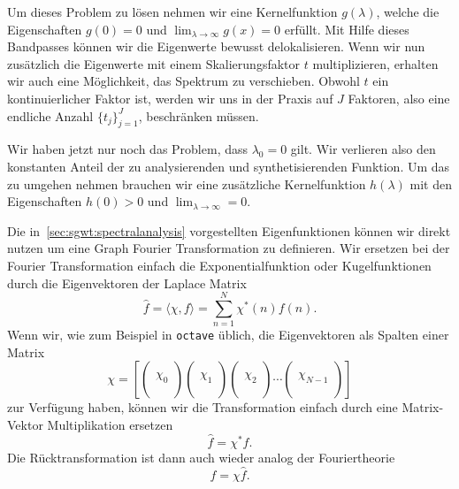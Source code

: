 Um dieses Problem zu l\"osen nehmen wir eine Kernelfunktion $g(\lambda)$, 
welche die Eigenschaften $g(0) = 0$ und $\lim_{\lambda\to\infty} g(x) = 0$ 
erf\"ullt. Mit Hilfe dieses Bandpasses k\"onnen wir die Eigenwerte bewusst 
delokalisieren. Wenn wir nun zus\"atzlich die Eigenwerte mit einem 
Skalierungsfaktor $t$ multiplizieren, erhalten wir auch eine 
M\"oglichkeit, das Spektrum zu verschieben. Obwohl $t$ ein kontinuierlicher 
Faktor ist, werden wir uns in der Praxis auf $J$ Faktoren, also eine endliche 
Anzahl $\{t_j\}^J_{j=1}$, beschr\"anken m\"ussen.

Wir haben jetzt nur noch das Problem, dass $\lambda_0 = 0$ gilt. Wir verlieren 
also den konstanten Anteil der zu analysierenden und synthetisierenden 
Funktion. Um das zu umgehen nehmen brauchen wir eine zus\"atzliche 
Kernelfunktion $h(\lambda)$ mit den Eigenschaften $h(0) > 0$ und 
$\lim_{\lambda\to\infty} = 0$.

Die in~\cref{sec:sgwt:spectralanalysis} vorgestellten Eigenfunktionen 
k\"onnen wir direkt nutzen um eine Graph Fourier Transformation zu definieren. 
Wir ersetzen bei der Fourier Transformation einfach die Exponentialfunktion 
oder Kugelfunktionen durch die Eigenvektoren der Laplace Matrix
\begin{equation*}
\hat{f} = \langle \chi, f \rangle = \sum_{n = 1}^{N} \chi^*(n)f(n).
\end{equation*}
Wenn wir, wie zum Beispiel in \texttt{octave} \"ublich, die Eigenvektoren als 
Spalten einer Matrix
\begin{equation}
\chi = 
\left[
\begin{pmatrix}\\\chi_0\\\\\end{pmatrix}
\begin{pmatrix}\\\chi_1\\\\\end{pmatrix}
\begin{pmatrix}\\\chi_2\\\\\end{pmatrix}
\cdots
\begin{pmatrix}\\\chi_{N-1}\\\\\end{pmatrix}
\right]
\end{equation}
zur Verf\"ugung haben, k\"onnen wir die Transformation 
einfach durch eine Matrix-Vektor Multiplikation ersetzen
\begin{equation*}
\hat{f} = \chi^* f.
\end{equation*}
Die R\"ucktransformation ist dann auch wieder analog der Fouriertheorie
\begin{equation*}
f = \chi \hat{f}.
\end{equation*}


